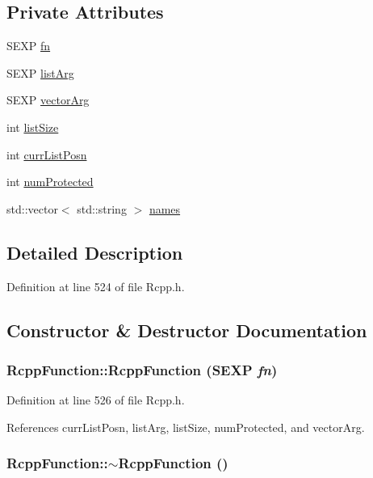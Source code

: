 \subsection*{Private Attributes}
\begin{CompactItemize}
\item 
SEXP \hyperlink{classRcppFunction_a6b5966224b8b7d158be6cdfc3612063}{fn}
\item 
SEXP \hyperlink{classRcppFunction_3b8a2c8441c9791f9fe5bd5273bbceec}{listArg}
\item 
SEXP \hyperlink{classRcppFunction_0492c128c0f72cda44e679265b36b50e}{vectorArg}
\item 
int \hyperlink{classRcppFunction_c3a42478ffd123f430ba3e09099db6f8}{listSize}
\item 
int \hyperlink{classRcppFunction_ce513a92e96b36883b709b5352ea5663}{currListPosn}
\item 
int \hyperlink{classRcppFunction_dc777e7d1628ccc4f531a8375f30f385}{numProtected}
\item 
std::vector$<$ std::string $>$ \hyperlink{classRcppFunction_bf9e86df5e1a290a5f321e6051f0d2b2}{names}
\end{CompactItemize}


\subsection{Detailed Description}


Definition at line 524 of file Rcpp.h.

\subsection{Constructor \& Destructor Documentation}
\hypertarget{classRcppFunction_6fc6fca8d052170d86240c784f54261a}{
\subsubsection[RcppFunction]{\setlength{\rightskip}{0pt plus 5cm}RcppFunction::RcppFunction (SEXP {\em fn})}}
\label{classRcppFunction_6fc6fca8d052170d86240c784f54261a}




Definition at line 526 of file Rcpp.h.

References currListPosn, listArg, listSize, numProtected, and vectorArg.\hypertarget{classRcppFunction_e155cf5dd33cb110e9a89a59c7bff6e9}{
\subsubsection[$\sim$RcppFunction]{\setlength{\rightskip}{0pt plus 5cm}RcppFunction::$\sim$RcppFunction ()}}
\label{classRcppFunction_e155cf5dd33cb110e9a89a59c7bff6e9}




